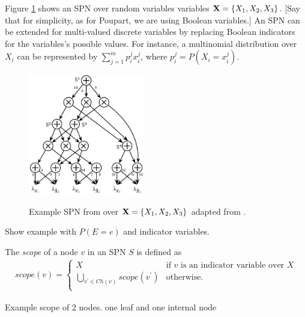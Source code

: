 %
%

Figure \ref{fig:spn} shows an SPN over random variables variables ${\bf X}=\{X_1,X_2,X_3\}$.
[Say that for simplicity, as for Poupart, we are using Boolean variables.]
An SPN can be extended for multi-valued discrete variables by replacing Boolean indicators for the variables's possible values.
For instance, a multinomial distribution over $X_i$ can be represented by $\sum_{j=1}^{m}{p^j_i x^j_i}$, where $p^j_i = P(X_i = x^j_i)$.


\begin{figure}[h]
    \begin{center}
		\includegraphics[width=0.45\textwidth]{figures/SPN.png}
		\caption{Example SPN from over ${\bf X}=\{X_1,X_2,X_3\}$ adapted from \cite{Peharz:2016wl}.}
		\label{fig:spn}
    \label{fig:spn}
    \end{center}
\end{figure}

\begin{example}
Show example with $P(E=e)$ and indicator variables.	
\end{example}

The \emph{scope} of a node $v$ in an SPN $S$ is defined as
\begin{align*}
scope(v) = \begin{cases}
				X & \text{if $v$ is an indicator variable over $X$}\\
				\bigcup_{v^\prime \in Ch(v)}{scope(v^\prime)} &\text{otherwise.}\\
			\end{cases}
\end{align*}

\begin{example}
	Example scope of 2 nodes. one leaf and one internal node
\end{example}

